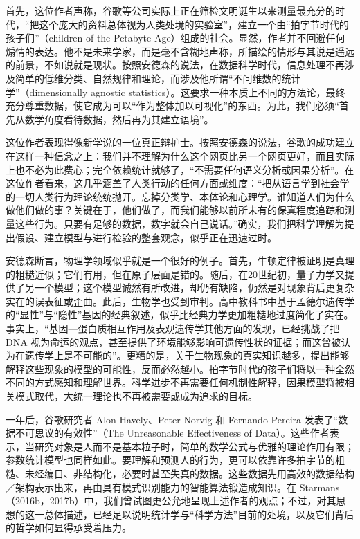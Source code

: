 首先，这位作者声称，谷歌等公司实际上正在筛检文明诞生以来测量最充分的时代，“把这个庞大的资料总体视为人类处境的实验室”，建立一个由“拍字节时代的孩子们”（children of the Petabyte Age）组成的社会。显然，作者并不回避任何煽情的表达。他不是未来学家，而是毫不含糊地声称，所描绘的情形与其说是遥远的前景，不如说就是现状。按照安德森的说法，在数据科学时代，信息处理不再涉及简单的低维分类、自然规律和理论，而涉及他所谓“不问维数的统计学”（dimensionally agnostic statistics）。这要求一种本质上不同的方法论，最终充分尊重数据，使它成为可以“作为整体加以可视化”的东西。为此，我们必须“首先从数学角度看待数据，然后再为其建立语境”。

这位作者表现得像新学说的一位真正辩护士。按照安德森的说法，谷歌的成功建立在这样一种信念之上：我们并不理解为什么这个网页比另一个网页更好，而且实际上也不必为此费心；完全依赖统计就够了，“不需要任何语义分析或因果分析”。在这位作者看来，这几乎涵盖了人类行动的任何方面或维度：“把从语言学到社会学的一切人类行为理论统统抛开。忘掉分类学、本体论和心理学。谁知道人们为什么做他们做的事？关键在于，他们做了，而我们能够以前所未有的保真程度追踪和测量这些行为。只要有足够的数据，数字就会自己说话。”确实，我们把科学理解为提出假设、建立模型与进行检验的整套观念，似乎正在迅速过时。

安德森断言，物理学领域似乎就是一个很好的例子。首先，牛顿定律被证明是真理的粗糙近似；它们有用，但在原子层面是错的。随后，在20世纪初，量子力学又提供了另一个模型；这个模型诚然有所改进，却仍有缺陷，仍然是对现象背后更复杂实在的误表征或歪曲。此后，生物学也受到审判。高中教科书中基于孟德尔遗传学的“显性”与“隐性”基因的经典叙述，似乎比经典力学更加粗糙地过度简化了实在。事实上，“基因—蛋白质相互作用及表观遗传学其他方面的发现，已经挑战了把 DNA 视为命运的观点，甚至提供了环境能够影响可遗传性状的证据；而这曾被认为在遗传学上是不可能的”。更糟的是，关于生物现象的真实知识越多，提出能够解释这些现象的模型的可能性，反而必然越小。拍字节时代的孩子们将以一种全然不同的方式感知和理解世界。科学进步不再需要任何机制性解释，因果模型将被相关模式取代，大统一理论也不再被需要或成为追求的目标。

一年后，谷歌研究者 Alon Havely、Peter Norvig 和 Fernando Pereira 发表了“数据不可思议的有效性”（The Unreasonable Effectiveness of Data）。这些作者表示，当研究对象是人而不是基本粒子时，简单的数学公式与优雅的理论作用有限；参数统计模型也同样如此。要理解和预测人的行为，更可以依靠许多拍字节的粗糙、未经编目、非结构化，必要时甚至失真的数据。这些数据先用高效的数据结构／架构表示出来，再由具有模式识别能力的智能算法锻造成知识。在 Starmans（2016b，2017b）中，我们曾试图更公允地呈现上述作者的观点；不过，对其思想的这一总体描述，已经足以说明统计学与“科学方法”目前的处境，以及它们背后的哲学如何显得承受着压力。


